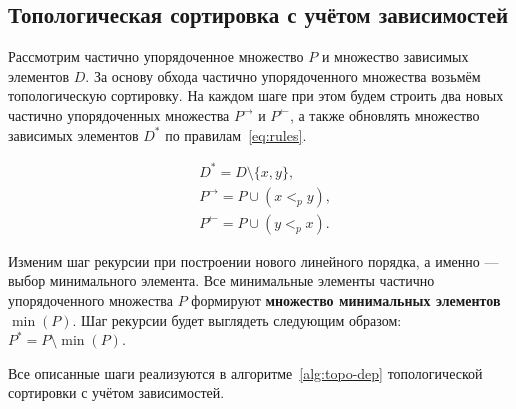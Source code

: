 \subsection{Топологическая сортировка с учётом зависимостей}

Рассмотрим частично упорядоченное множество $P$ и множество зависимых
элементов $D$. За основу обхода частично упорядоченного множества
возьмём топологическую сортировку. На каждом шаге при этом будем
строить два новых частично упорядоченных множества $P^{\rightarrow}$
и $P^{\leftarrow}$, а также обновлять множество зависимых элементов
$D^{*}$ по правилам~\eqref{eq:rules}.

\begin{equation}\label{eq:rules}
  \begin{aligned}
    &D^{*} = D \setminus \{x, y\}, \\
    &P^{\rightarrow} = P \cup (x <_{p} y), \\
    &P^{\leftarrow} = P \cup (y <_{p} x).
  \end{aligned}
\end{equation}

Изменим шаг рекурсии при построении нового линейного порядка, а
именно — выбор минимального элемента. Все минимальные элементы
частично упорядоченного множества $P$ формируют \textbf{множество
минимальных элементов} $\min(P)$. Шаг рекурсии будет выглядеть
следующим образом: $P^{*} = P \setminus \min(P)$.

Все описанные шаги реализуются в алгоритме~\ref{alg:topo-dep}
топологической сортировки с учётом зависимостей.


